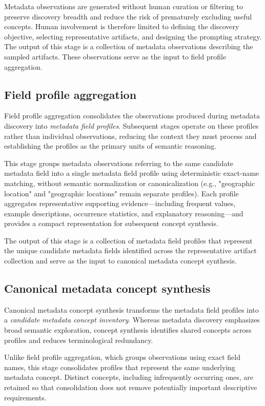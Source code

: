 \documentclass{article}
\begin{document}
Metadata observations are generated without human curation or filtering to preserve discovery breadth and reduce the risk of prematurely excluding useful concepts. Human involvement is therefore limited to defining the discovery objective, selecting representative artifacts, and designing the prompting strategy. The output of this stage is a collection of metadata observations describing the sampled artifacts. These observations serve as the input to field profile aggregation.

\subsection{Field profile aggregation}

Field profile aggregation consolidates the observations produced during metadata discovery into \emph{metadata field profiles}. Subsequent stages operate on these profiles rather than individual observations, reducing the context they must process and establishing the profiles as the primary units of semantic reasoning.

This stage groups metadata observations referring to the same candidate metadata field into a single metadata field profile using deterministic exact-name matching, without semantic normalization or canonicalization (e.g., "geographic location" and "geographic locations" remain separate profiles). Each profile aggregates representative supporting evidence—including frequent values, example descriptions, occurrence statistics, and explanatory reasoning—and provides a compact representation for subsequent concept synthesis.

The output of this stage is a collection of metadata field profiles that represent the unique candidate metadata fields identified across the representative artifact collection and serve as the input to canonical metadata concept synthesis.

\subsection{Canonical metadata concept synthesis}

Canonical metadata concept synthesis transforms the metadata field profiles into a \emph{candidate metadata concept inventory}. Whereas metadata discovery emphasizes broad semantic exploration, concept synthesis identifies shared concepts across profiles and reduces terminological redundancy.

Unlike field profile aggregation, which groups observations using exact field names, this stage consolidates profiles that represent the same underlying metadata concept. Distinct concepts, including infrequently occurring ones, are retained so that consolidation does not remove potentially important descriptive requirements.
\end{document}
